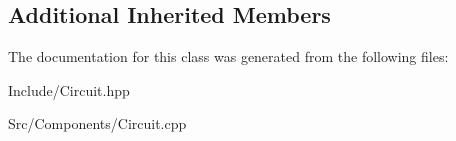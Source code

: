 \subsection*{Additional Inherited Members}


The documentation for this class was generated from the following files\+:\begin{DoxyCompactItemize}
\item 
Include/Circuit.\+hpp\item 
Src/\+Components/Circuit.\+cpp\end{DoxyCompactItemize}
